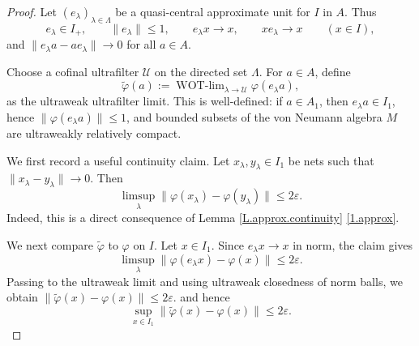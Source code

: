 \documentclass[11pt]{amsproc}
\DeclareMathOperator{\WOTlim}{WOT-\lim}
\newcommand{\cU}{\mathcal U}
\theoremstyle{definition}
\theoremstyle{plain}
\theoremstyle{remark}
\begin{document}
\begin{proof}
Let $(e_\lambda)_{\lambda\in\Lambda}$ be a quasi-central approximate unit
for $I$ in $A$. Thus
\[
e_\lambda\in I_+,\qquad \|e_\lambda\|\leq 1, \qquad
e_\lambda x\to x,\qquad xe_\lambda\to x
\qquad (x\in I),
\]
and
$
\|e_\lambda a-ae_\lambda\|\to 0
$ for all $a\in A$.

Choose a cofinal ultrafilter $\cU$ on the directed set $\Lambda$.
For $a\in A$, define
\[
\widetilde\varphi(a)
:=
\WOTlim_{\lambda\to\cU}\varphi(e_\lambda a),
\]
as the ultraweak ultrafilter limit. This is well-defined:
if $a\in A_1$, then $e_\lambda a\in I_1$, hence
$\|\varphi(e_\lambda a)\|\leq 1$, and bounded subsets of the
von Neumann algebra $M$ are ultraweakly relatively compact.

We first record a useful continuity claim. Let $x_\lambda,y_\lambda\in I_1$ be nets such that
$\|x_\lambda-y_\lambda\|\to 0$. Then
\[
\limsup_\lambda
\|\varphi(x_\lambda)-\varphi(y_\lambda)\|
\leq 2\varepsilon.
\]
Indeed, this is a direct consequence of Lemma \ref{L.approx.continuity} \eqref{1.approx}.

We next compare $\widetilde\varphi$ to $\varphi$ on $I$.
Let $x\in I_1$. Since $e_\lambda x\to x$ in norm, the claim gives
\[
\limsup_\lambda
\|\varphi(e_\lambda x)-\varphi(x)\|
\leq 2\varepsilon.
\]
Passing to the ultraweak limit and using ultraweak closedness of norm balls,
we obtain
$
\|\widetilde\varphi(x)-\varphi(x)\|
\leq 2\varepsilon.
$ and hence
\[
\sup_{x\in I_1}
\|\widetilde\varphi(x)-\varphi(x)\|
\leq 2\varepsilon.
\]


\end{proof}
\end{document}
